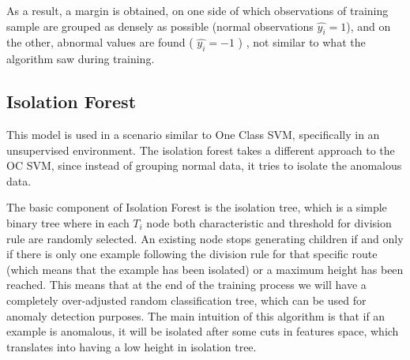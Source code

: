 \vspace{5mm} %

As a result, a margin is obtained, on one side of which observations of  training sample are grouped as densely as possible (normal observations $\hat{y_{i}} = 1$), and on the other, abnormal values are found ( $\hat{y_{i}} = -1$ ) , not similar to what the algorithm saw during training.

\subsection{Isolation Forest}

This model is used in a scenario similar to One Class SVM, specifically in an unsupervised environment. The isolation forest takes a different approach to the OC SVM, since instead of grouping normal data, it tries to isolate the anomalous data.

\vspace{5mm} %

The basic component of Isolation Forest is the isolation tree, which is a simple binary tree where in each $T_{i}$ node both characteristic and threshold for division rule are randomly selected. An existing node stops generating children if and only if there is only one example following the division rule for that specific route (which means that the example has been isolated) or a maximum height has been reached. This means that at the end of the training process we will have a completely over-adjusted random classification tree, which can be used for anomaly detection purposes. The main intuition of this algorithm is that if an example is anomalous, it will be isolated after some cuts in features space, which translates into having a low height in isolation tree.

